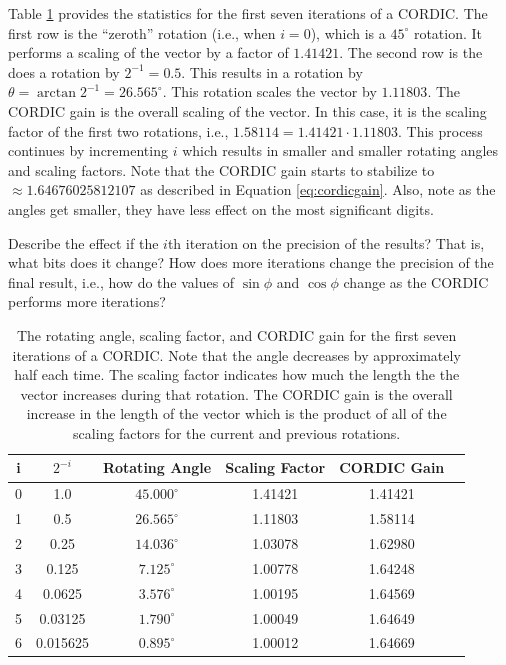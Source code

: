 Table \ref{table:cordic} provides the statistics for the first seven iterations of a CORDIC. The first row is the ``zeroth'' rotation (i.e., when $i=0$), which is a $45^{\circ}$ rotation. It performs a scaling of the vector by a factor of $1.41421$. The second row is the does a rotation by $2^{-1} = 0.5$. This results in a rotation by $\theta = \arctan 2^{-1} = 26.565^{\circ}$. This rotation scales the vector by $1.11803$. The CORDIC gain is the overall scaling of the vector. In this case, it is the scaling factor of the first two rotations, i.e., $1.58114 = 1.41421 \cdot 1.11803$. This process continues by incrementing $i$ which results in smaller and smaller rotating angles and scaling factors. Note that the CORDIC gain starts to stabilize to $\approx 1.64676025812107$ as described in Equation \ref{eq:cordicgain}. Also, note as the angles get smaller, they have less effect on the most significant digits. 

\begin{exercise}
Describe the effect if the $i$th iteration on the precision of the results? That is, what bits does it change? How does more iterations change the precision of the final result, i.e., how do the values of $\sin \phi$ and $\cos \phi$ change as the CORDIC performs more iterations?
\end{exercise}



\begin{table}[htbp]
\caption{The rotating angle, scaling factor, and CORDIC gain for the first seven iterations of a CORDIC. Note that the angle decreases by approximately half each time. The scaling factor indicates how much the length the the vector increases during that rotation. The CORDIC gain is the overall increase in the length of the vector which is the product of all of the scaling factors for the current and previous rotations.}
\begin{center}
\begin{tabular}{|c|c|c|c|c|c|}
\hline
i & $2^{-i}$ 	& Rotating Angle  	& Scaling Factor 	& CORDIC Gain 	\\ \hline \hline
0 & 1.0 		& $45.000^{\circ}$	& 1.41421			& 1.41421		\\ \hline
1 & 0.5 		& $26.565^{\circ}$	& 1.11803			& 1.58114		\\ \hline
2 & 0.25 		& $14.036^{\circ}$	& 1.03078			& 1.62980		\\ \hline
3 & 0.125 		& $7.125^{\circ}$	& 1.00778			& 1.64248		\\ \hline
4 & 0.0625 	& $3.576^{\circ}$	& 1.00195			& 1.64569		\\ \hline
5 & 0.03125 	& $1.790^{\circ}$	& 1.00049			& 1.64649		\\ \hline
6 & 0.015625 	& $0.895^{\circ}$	& 1.00012			& 1.64669		\\ \hline
\end{tabular}
\end{center}
\label{table:cordic}
\end{table}%

